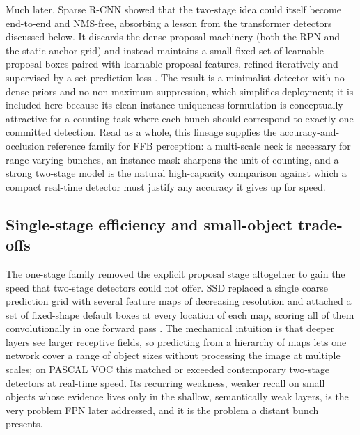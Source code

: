 Much later, Sparse R-CNN showed that the two-stage idea could itself become end-to-end and NMS-free, absorbing a lesson from the transformer detectors discussed below. It discards the dense proposal machinery (both the RPN and the static anchor grid) and instead maintains a small fixed set of learnable proposal boxes paired with learnable proposal features, refined iteratively and supervised by a set-prediction loss \cite{sun2021sparsercnn}. The result is a minimalist detector with no dense priors and no non-maximum suppression, which simplifies deployment; it is included here because its clean instance-uniqueness formulation is conceptually attractive for a counting task where each bunch should correspond to exactly one committed detection. Read as a whole, this lineage supplies the accuracy-and-occlusion reference family for FFB perception: a multi-scale neck is necessary for range-varying bunches, an instance mask sharpens the unit of counting, and a strong two-stage model is the natural high-capacity comparison against which a compact real-time detector must justify any accuracy it gives up for speed.

\subsection{Single-stage efficiency and small-object trade-offs}

The one-stage family removed the explicit proposal stage altogether to gain the speed that two-stage detectors could not offer. SSD replaced a single coarse prediction grid with several feature maps of decreasing resolution and attached a set of fixed-shape default boxes at every location of each map, scoring all of them convolutionally in one forward pass \cite{liu2016ssd}. The mechanical intuition is that deeper layers see larger receptive fields, so predicting from a hierarchy of maps lets one network cover a range of object sizes without processing the image at multiple scales; on PASCAL VOC this matched or exceeded contemporary two-stage detectors at real-time speed. Its recurring weakness, weaker recall on small objects whose evidence lives only in the shallow, semantically weak layers, is the very problem FPN later addressed, and it is the problem a distant bunch presents.


